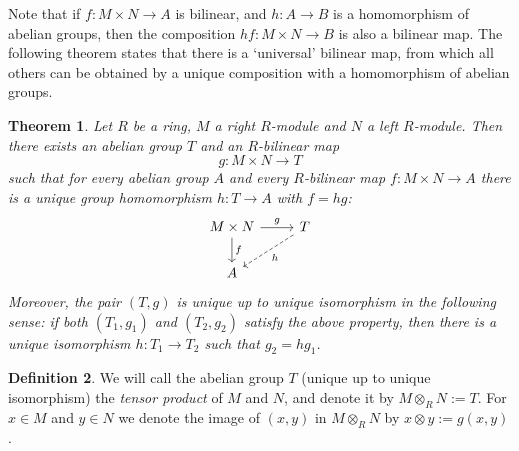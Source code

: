 \documentclass[11pt]{amsbook}
\theoremstyle{plain}
\newtheorem{theorem}{Theorem}
\theoremstyle{definition}
\newtheorem{definition}[theorem]{Definition}
\begin{document}
Note that if $f\colon M\times N\to A$ is bilinear, and $h\colon A\to B$ is a homomorphism of abelian groups, then the composition $hf\colon M\times N \to B$ is also a bilinear map. The following theorem states that there is a `universal' bilinear map, from which all others can be obtained by a unique composition with a homomorphism of abelian groups.

\begin{theorem}\label{thm:existence-of-tensor-product}
Let $R$ be a ring, $M$ a right $R$-module and $N$ a left $R$-module. Then there exists an abelian group $T$ and an $R$-bilinear map
\[
	g\colon M\times N \to T
\]
such that for every abelian group $A$ and every $R$-bilinear map $f\colon M\times N \to A$ there is a unique group homomorphism
$h\colon T \to A$ with $f=hg$:
\[
\begin{tikzcd}
M\times N\arrow{r}{g} \arrow{d}{f} & T \arrow[dashed]{ld}{h} \\
A
\end{tikzcd}
\]
Moreover, the pair $(T,g)$ is unique up to unique isomorphism in the following sense: if both $(T_1,g_1)$ and $(T_2,g_2)$ satisfy the above property, then there is a unique isomorphism $h\colon T_1 \to T_2$ such that $g_2=hg_1$.
\end{theorem}


\begin{definition}We will call the abelian group $T$ (unique up to unique isomorphism) the \emph{tensor product} of $M$ and $N$, and denote it by $M\otimes_R N := T $. For $x\in M$ and $y\in N$ we denote the image of $(x,y)$ in $M\otimes_R N$ by $x\otimes y := g(x,y)$. 
\end{definition}

\end{document}

